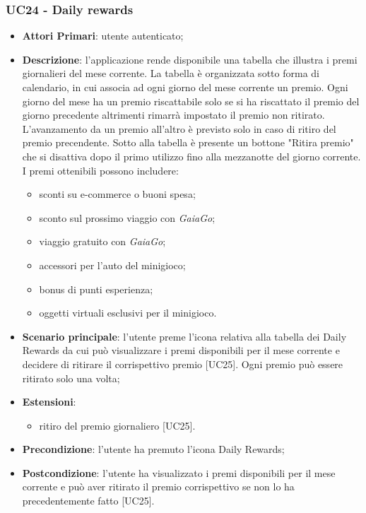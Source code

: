 
\subsubsection{UC24 - Daily rewards}
\begin{itemize}
	\item \textbf{Attori Primari}: utente autenticato;
	\item \textbf{Descrizione}: l'applicazione rende disponibile una tabella che illustra i premi giornalieri del mese corrente. La tabella è organizzata sotto forma di calendario, in cui associa ad ogni giorno del mese corrente un premio. Ogni giorno del mese ha un premio riscattabile solo se si ha riscattato il premio del giorno precedente altrimenti rimarrà impostato il premio non ritirato. L'avanzamento da un premio all'altro è previsto solo in caso di ritiro del premio precendente. 
	Sotto alla tabella è presente un bottone "Ritira premio" che si disattiva dopo il primo utilizzo fino alla mezzanotte del giorno corrente.\\
	I premi ottenibili possono includere:
	\begin{itemize}
		\item sconti su e-commerce o buoni spesa;
		\item sconto sul prossimo viaggio con \textit{GaiaGo};
		\item viaggio gratuito con \textit{GaiaGo};
		\item accessori per l'auto del minigioco;
		\item bonus di punti esperienza;
		\item oggetti virtuali esclusivi per il minigioco.
	\end{itemize}
	\item \textbf{Scenario principale}: l'utente preme l'icona relativa alla tabella dei Daily Rewards da cui può visualizzare i premi disponibili per il mese corrente e decidere di ritirare il corrispettivo premio [UC25].
	Ogni premio può essere ritirato solo una volta;
	\item \textbf{Estensioni}: 
		\begin{itemize}
			\item ritiro del premio giornaliero [UC25].
		\end{itemize}
	\item \textbf{Precondizione}: l'utente ha premuto l'icona Daily Rewards;
	\item \textbf{Postcondizione}: l'utente ha visualizzato i premi disponibili per il mese corrente e può aver ritirato il premio corrispettivo se non lo ha precedentemente fatto [UC25]. 
\end{itemize} 
